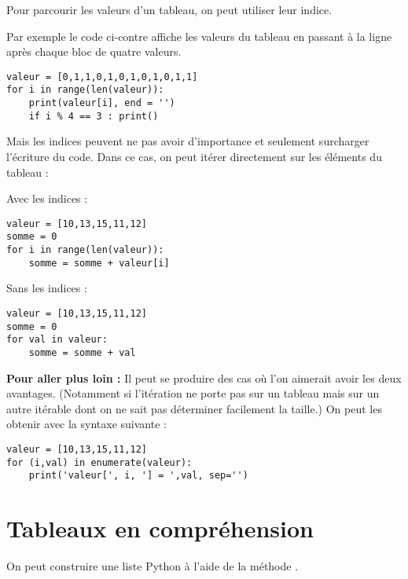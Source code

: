 Pour parcourir les valeurs d'un tableau, on peut utiliser leur indice.

\begin{multicols}{2}
Par exemple le code ci-contre affiche les valeurs du tableau en passant à la ligne après chaque bloc de quatre valeurs.

\begin{verbatim}
valeur = [0,1,1,0,1,0,1,0,1,0,1,1]
for i in range(len(valeur)):
    print(valeur[i], end = '')
    if i % 4 == 3 : print()
\end{verbatim}
\end{multicols}

Mais les indices peuvent ne pas avoir d'importance et seulement surcharger l'écriture du code. Dans ce cas, on peut itérer directement sur les éléments du tableau :


\begin{multicols}{2}
Avec les indices :

\vspace{-2ex}
\begin{verbatim}
valeur = [10,13,15,11,12]
somme = 0
for i in range(len(valeur)):
    somme = somme + valeur[i]
\end{verbatim}

Sans les indices :

\vspace{-2ex}
\begin{verbatim}
valeur = [10,13,15,11,12]
somme = 0
for val in valeur:
    somme = somme + val
\end{verbatim}
\end{multicols}

{\bfseries Pour aller plus loin :} Il peut se produire des cas où l'on aimerait avoir les deux avantages. (Notamment si l'itération ne porte pas sur un tableau mais sur un autre itérable dont on ne sait pas déterminer facilement la taille.) On peut les obtenir avec la syntaxe suivante :


\vspace{-2ex}
\begin{verbatim}
valeur = [10,13,15,11,12]
for (i,val) in enumerate(valeur):
    print('valeur[', i, '] = ',val, sep='')
\end{verbatim}

\section{Tableaux en compréhension}

On peut construire une liste Python à l'aide de la méthode .

